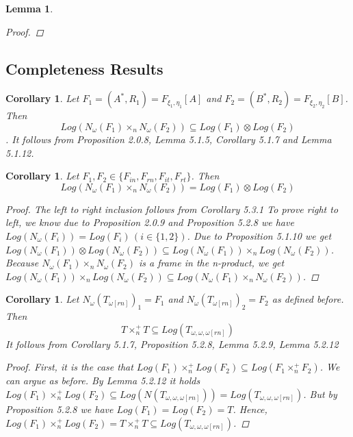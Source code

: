 \documentclass[12pt, a4paper]{scrartcl}
\newtheorem{lemma}[definition]{Lemma}
\newtheorem{corollary}[definition]{Corollary}
\begin{document}
\begin{lemma}
\begin{proof}
        \end{proof}
    \end{lemma}

    \subsection{Completeness Results}
    \begin{corollary}
        Let $F_1 = (A^*,R_1) = F_{\xi_1, \eta_1}[A]$ and $F_2 = (B^*,R_2) = F_{\xi_2, \eta_2}[B]$. Then 
        $$Log(N_\omega(F_1) \times_n N_\omega(F_2))  \subseteq Log(F_1) \otimes Log(F_2)$$.
        It follows from Proposition 2.0.8, Lemma 5.1.5, Corollary 5.1.7 and Lemma 5.1.12.
    \end{corollary}

    \begin{corollary}
        Let $F_1, F_2 \in \{F_{in}, F_{rn}, F_{it}, F_{rt}\}$. Then 
        $$Log(N_\omega(F_1) \times_nN_\omega(F_2)) = Log(F_1) \otimes Log(F_2)$$

        \begin{proof}
            The left to right inclusion follows from Corollary 5.3.1 \newline \newline
            To prove right to left, we know due to Proposition 2.0.9 and Proposition 5.2.8 we have $Log(N_\omega(F_i)) = Log(F_i) \, (i \in \{1,2\})$.
            Due to Proposition 5.1.10 we get $Log(N_\omega(F_1)) \otimes Log(N_\omega(F_2)) \subseteq Log(N_\omega(F_1)) \times_n Log(N_\omega(F_2))$. 
            Because $N_\omega(F_1)\times_n N_\omega(F_2)$ is a frame in the n-product, we get
            $Log(N_\omega(F_1)) \times_n Log(N_\omega(F_2)) \subseteq Log(N_\omega(F_1)\times_n N_\omega(F_2))$.

        \end{proof}

    \end{corollary}

    \begin{corollary}
        Let $N_\omega(T_{\omega[rn]})_1 = F_1$ and $N_\omega(T_{\omega[rn]})_2 = F_2$ as defined before. Then 
        $$T \times^+_n T \subseteq Log(T_{\omega,\omega,\omega[rn]})$$
        It follows from Corollary 5.1.7, Proposition 5.2.8, Lemma 5.2.9, Lemma 5.2.12

        \begin{proof}
            First, it is the case that $Log(F_1) \times^+_n Log(F_2) \subseteq Log(F_1 \times^+_n F_2)$. We can argue as before.
            By Lemma 5.2.12 it holds $Log(F_1) \times^+_n Log(F_2) \subseteq Log(N(T_{\omega,\omega,\omega[rn]})) = Log(T_{\omega,\omega,\omega[rn]})$.
            But by Proposition 5.2.8 we have $Log(F_1) = Log(F_2) = T$. Hence, $Log(F_1) \times^+_n Log(F_2) = T \times^+_n T \subseteq Log(T_{\omega,\omega,\omega[rn]})$.
        \end{proof}

    \end{corollary}
\end{document}
